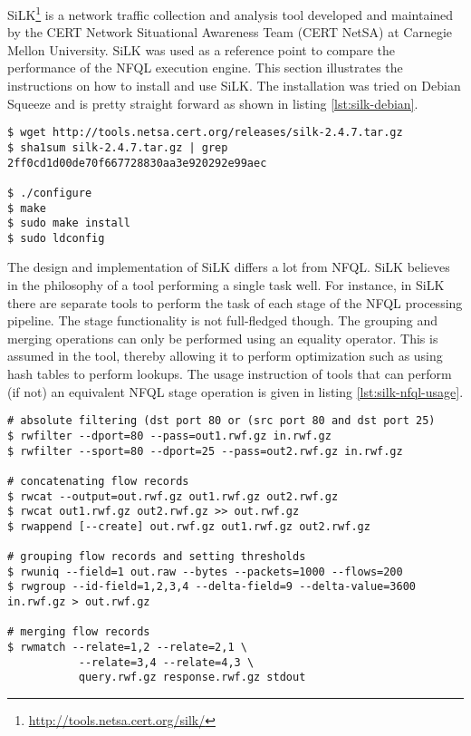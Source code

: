 SiLK\footnote{\url{http://tools.netsa.cert.org/silk/}} is a network traffic
collection and analysis tool developed and maintained by the CERT Network
Situational Awareness Team (CERT NetSA) at Carnegie Mellon University. SiLK
was used as a reference point to compare the performance of the \ac{NFQL}
execution engine. This section illustrates the instructions on how to install
and use SiLK. The installation was tried on Debian Squeeze and is pretty
straight forward as shown in listing \ref{lst:silk-debian}.

\begin{lstlisting}
$ wget http://tools.netsa.cert.org/releases/silk-2.4.7.tar.gz
$ sha1sum silk-2.4.7.tar.gz | grep 2ff0cd1d00de70f667728830aa3e920292e99aec

$ ./configure
$ make
$ sudo make install
$ sudo ldconfig
\end{lstlisting}

The design and implementation of SiLK differs a lot from \ac{NFQL}. SiLK
believes in the philosophy of a tool performing a single task well. For
instance, in SiLK there are separate tools to perform the task of each stage
of the \ac{NFQL} processing pipeline. The stage functionality is not
full-fledged though. The grouping  and
merging operations can only be performed using an equality operator. This is
assumed in the tool, thereby allowing it to perform optimization such as using
hash tables to perform lookups. The usage instruction of tools that can
perform (if not) an equivalent \ac{NFQL} stage operation is given in listing
\ref{lst:silk-nfql-usage}.

\begin{lstlisting}
# absolute filtering (dst port 80 or (src port 80 and dst port 25)
$ rwfilter --dport=80 --pass=out1.rwf.gz in.rwf.gz
$ rwfilter --sport=80 --dport=25 --pass=out2.rwf.gz in.rwf.gz

# concatenating flow records
$ rwcat --output=out.rwf.gz out1.rwf.gz out2.rwf.gz
$ rwcat out1.rwf.gz out2.rwf.gz >> out.rwf.gz
$ rwappend [--create] out.rwf.gz out1.rwf.gz out2.rwf.gz

# grouping flow records and setting thresholds
$ rwuniq --field=1 out.raw --bytes --packets=1000 --flows=200
$ rwgroup --id-field=1,2,3,4 --delta-field=9 --delta-value=3600 in.rwf.gz > out.rwf.gz

# merging flow records
$ rwmatch --relate=1,2 --relate=2,1 \
           --relate=3,4 --relate=4,3 \
           query.rwf.gz response.rwf.gz stdout
\end{lstlisting}

